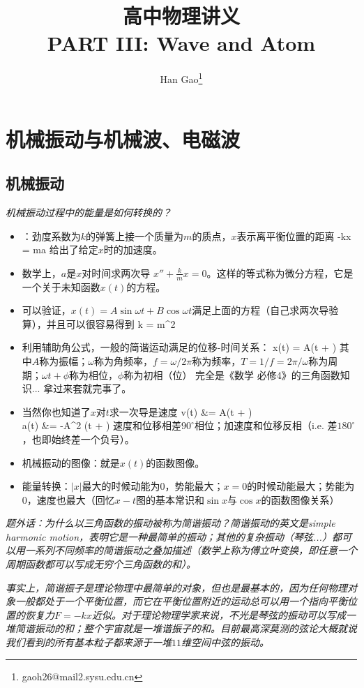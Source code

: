 \documentclass[a4paper,9pt]{ctexart}
\title{高中物理讲义\\ PART III: Wave and Atom}
\author{Han Gao\footnote{gaoh26@mail2.sysu.edu.cn}}
\begin{document}
\maketitle
\tableofcontents

\newpage
\section{机械振动与机械波、电磁波}
\subsection{机械振动}
\emph{机械振动过程中的能量是如何转换的？}
\begin{itemize}
\item
{}：劲度系数为$k$的弹簧上接一个质量为$m$的质点，$x$表示离平衡位置的距离
\beq
-kx = ma
\eeq
给出了给定$x$时的加速度。
\item
数学上，$a$是$x$对时间求两次导 \so $x'' + \frac{k}{m} x= 0$。这样的等式称为微分方程，它是一个关于未知函数$x(t)$的方程。
\item
可以验证，$x(t) = A\sin \omega t + B \cos \omega t$满足上面的方程（自己求两次导验算），并且可以很容易得到
\beq
k = m\omega^2
\eeq
\item
利用辅助角公式，一般的简谐运动满足的位移-时间关系：
\beq
x(t) = A\sin(\omega t + \phi)
\eeq
其中$A$称为振幅；$\omega$称为角频率，$f = \omega/2\pi$称为频率，$T = 1/f = 2\pi/\omega$称为周期；$\omega t + \phi$称为相位，$\phi$称为初相（位） \so 完全是《数学 必修4》的三角函数知识... 拿过来套就完事了。
\item
当然你也知道了$x$对$t$求一次导是速度 \so
\bea
v(t) &= A\omega \cos(\omega t + \phi) \\
a(t) &= -A\omega^2 \sin (\omega t + \phi)
\eea
\so 速度和位移相差$90^\circ$相位；加速度和位移反相（i.e. 差$180^\circ$，也即始终差一个负号）。
\item
机械振动的图像：就是$x(t)$的函数图像。
\item
能量转换：$|x|$最大的时候动能为0，势能最大；$x=0$的时候动能最大；势能为0，速度也最大（回忆$x-t$图的基本常识和$\sin x$与$\cos x$的函数图像关系）
\end{itemize}
\par
\emph{题外话：为什么以三角函数的振动被称为简谐振动？简谐振动的英文是simple harmonic motion，表明它是一种最简单的振动；其他的复杂振动（琴弦...）都可以用一系列不同频率的简谐振动之叠加描述（数学上称为傅立叶变换，即任意一个周期函数都可以写成无穷个三角函数的和）。}
\par
\emph{
事实上，简谐振子是理论物理中最简单的对象，但也是最基本的，因为任何物理对象一般都处于一个平衡位置，而它在平衡位置附近的运动总可以用一个指向平衡位置的恢复力$F=-kx$近似。对于理论物理学家来说，不光是琴弦的振动可以写成一堆简谐振动的和；整个宇宙就是一堆谐振子的和。目前最高深莫测的弦论大概就说我们看到的所有基本粒子都来源于一堆$11$维空间中弦的振动。}
\end{document}
